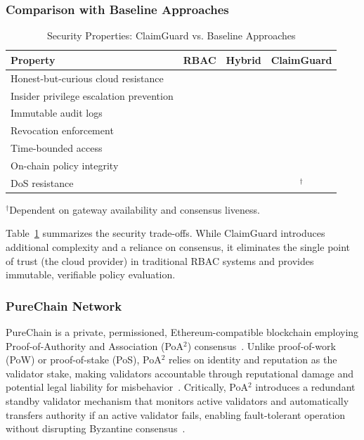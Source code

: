 \documentclass[final,5p,times,twocolumn]{elsarticle}
\newcommand{\cmark}{\ding{51}}
\newcommand{\xmark}{\ding{55}}
\begin{document}
\subsubsection{Comparison with Baseline Approaches}

\begin{table}[!htbp]
	\centering
	\small
	\caption{Security Properties: ClaimGuard vs. Baseline Approaches}
	\setlength{\tabcolsep}{3pt}
	\begin{tabular}{@{}p{3.2cm}ccc@{}}
		\toprule
		\textbf{Property}                       & \textbf{RBAC} & \textbf{Hybrid} & \textbf{Claim\-Guard} \\
		\midrule
		Honest-but-curious cloud resistance     & \xmark        & \xmark          & \cmark                \\
		Insider privilege escalation prevention & \xmark        & \xmark          & \cmark                \\
		Immutable audit logs                    & \xmark        & \cmark          & \cmark                \\
		Revocation enforcement                  & \cmark        & \cmark          & \cmark                \\
		Time-bounded access                     & \xmark        & \xmark          & \cmark                \\
		On-chain policy integrity               & \xmark        & \xmark          & \cmark                \\
		DoS resistance                          & \cmark        & \cmark          & \cmark$^{\dagger}$    \\
		\bottomrule
	\end{tabular}

	\footnotesize $^{\dagger}$Dependent on gateway availability and consensus liveness.
	\label{tab:security-comparison}
\end{table}

Table~\ref{tab:security-comparison} summarizes the security trade-offs. While ClaimGuard introduces additional complexity and a reliance on consensus, it eliminates the single point of trust (the cloud provider) in traditional RBAC systems and provides immutable, verifiable policy evaluation.

\subsubsection{PureChain Network}

PureChain is a private, permissioned, Ethereum-compatible blockchain employing Proof-of-Authority and Association (PoA$^2$) consensus~\cite{KIM2025100397}. Unlike proof-of-work (PoW) or proof-of-stake (PoS), PoA$^2$ relies on identity and reputation as the validator stake, making validators accountable through reputational damage and potential legal liability for misbehavior~\cite{joshi2021feasibility}. Critically, PoA$^2$ introduces a redundant standby validator mechanism that monitors active validators and automatically transfers authority if an active validator fails, enabling fault-tolerant operation without disrupting Byzantine consensus~\cite{KIM2025100397}.
\end{document}
